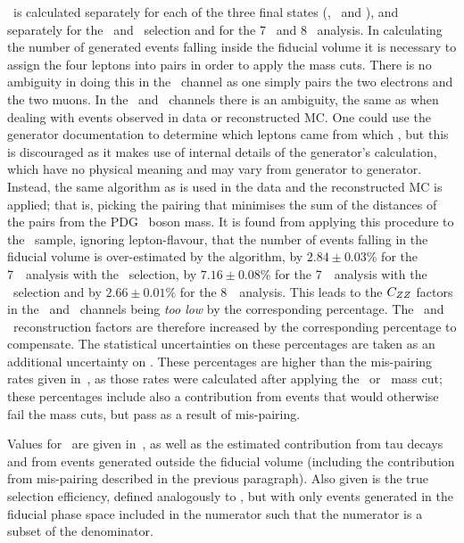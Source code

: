 \CZZ\ is calculated separately for each of the three final states (\eeee, \mmmm\
and \eemm), and separately for the \ZZ\ and \ZZs\ selection and for the 7 \tev\
and 8 \tev\ analysis. In calculating the number of generated events falling inside the fiducial volume
it is necessary to assign the four leptons into pairs in order to apply the mass
cuts. There is no ambiguity in doing this in the \eemm\ channel as one simply
pairs the two electrons and the two muons. In the \eeee\ and \mmmm\ channels
there is an ambiguity, the same as when dealing with events observed in data or
reconstructed MC. One could use the generator documentation to determine which
leptons came from which \Z, but this is discouraged as it makes use of internal
details of the generator's calculation, which have no physical meaning and may
vary from generator to generator. Instead,
the same algorithm as is used in the data and the reconstructed MC is applied; that is,
picking the pairing that minimises the sum of the distances of the pairs from
the PDG \Z\ boson mass. It is found from applying this procedure to the \eemm\
sample, ignoring lepton-flavour, that the number of events falling in the
fiducial volume is over-estimated by the algorithm, by $2.84\pm0.03\%$
for the 7~\tev\ analysis with the \ZZ\ selection, by $7.16\pm0.08\%$ for the
7~\tev\ analysis with the \ZZs\ selection and by $2.66\pm0.01\%$ for the
8~\tev\ analysis.
This leads to the  $C_{ZZ}$ factors in the
\eeee\ and \mmmm\ channels being {\it too low} by the corresponding percentage. 
The \eeee\ and \mmmm\
reconstruction factors are therefore increased by the corresponding percentage
to compensate. The statistical uncertainties on these percentages are taken as an
additional uncertainty on \CZZ. These percentages are higher than the
mis-pairing rates given in~, as those rates were calculated
after applying the \ZZ\ or \ZZs\ mass cut; these percentages include also a
contribution from events that would otherwise fail the mass cuts, but pass as a
result of mis-pairing.

Values for \CZZ\ are given
in~\tabs{objSel-czz-seven}{objSel-czz-eight}, as well as the estimated
contribution from tau decays and from events generated outside the fiducial
volume (including the contribution from mis-pairing described in the previous
paragraph).
Also given is the true selection efficiency, defined analogously to \CZZ, but
with only events generated in the fiducial phase space included in the numerator
such that the numerator is a subset of the denominator.

